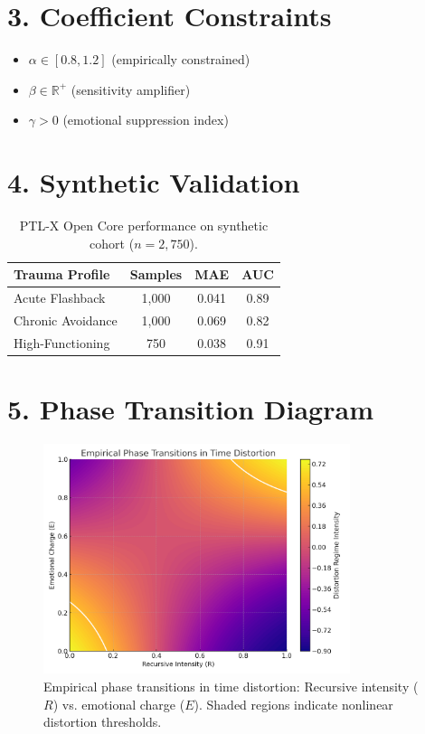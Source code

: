 \documentclass[12pt]{article}
\begin{document}
\section*{3. Coefficient Constraints}
\begin{itemize}[label=\textbullet,itemsep=0pt]
    \item $\alpha \in [0.8, 1.2]$ (empirically constrained)
    \item $\beta \in \mathbb{R}^{+}$ (sensitivity amplifier)
    \item $\gamma > 0$ (emotional suppression index)
\end{itemize}

\section*{4. Synthetic Validation}
\begin{table}[H]
\centering
\caption{PTL-X Open Core performance on synthetic cohort ($n=2,750$).}
\begin{tabular}{l c c c}
\toprule
\textbf{Trauma Profile} & \textbf{Samples} & \textbf{MAE} & \textbf{AUC} \\
\midrule
Acute Flashback & 1,000 & 0.041 & 0.89 \\
Chronic Avoidance & 1,000 & 0.069 & 0.82 \\
High-Functioning & 750 & 0.038 & 0.91 \\
\bottomrule
\end{tabular}
\end{table}

\section*{5. Phase Transition Diagram}
\begin{figure}[H]
\centering
\includegraphics[width=0.8\textwidth]{phase_diagram.png}
\caption{Empirical phase transitions in time distortion: Recursive intensity ($R$) vs. emotional charge ($E$). Shaded regions indicate nonlinear distortion thresholds.}
\end{figure}
\end{document}
